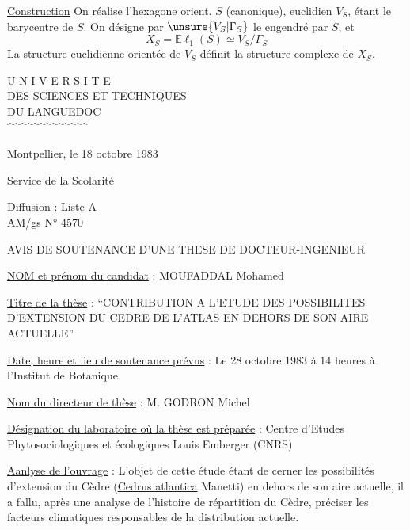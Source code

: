 \uline{Construction} On réalise l'hexagone orient. $S$  (canonique),   euclidien $V_S$,   étant le barycentre de $S$. On désigne par $\unsure{V_S|\Gamma_S}$ le   engendré par $S$, et
\[
X_S=\mathbb E\ell_1(S)\simeq V_S/\Gamma_S
\]
La structure euclidienne \uline{orientée} de $V_S$ définit la structure complexe de $X_S$.


\begin{center}
U N I V E R S I T E\\
DES SCIENCES ET TECHNIQUES\\
DU LANGUEDOC\\
\textasciicircum\textasciicircum\textasciicircum\textasciicircum\textasciicircum\textasciicircum\textasciicircum\textasciicircum\textasciicircum\textasciicircum\textasciicircum\textasciicircum\textasciicircum
\end{center}

Montpellier, le 18 octobre 1983

Service de la Scolarité

Diffusion : Liste A\\
AM/gs \hfill N° 4570

\begin{center}
AVIS DE SOUTENANCE D'UNE THESE DE DOCTEUR-INGENIEUR

\end{center}

\uline{NOM et prénom du candidat} : MOUFADDAL Mohamed

\uline{Titre de la thèse} : ``CONTRIBUTION A L'ETUDE DES POSSIBILITES D'EXTENSION DU CEDRE DE L'ATLAS EN DEHORS DE SON AIRE ACTUELLE''

\uline{Date, heure et lieu de soutenance prévus} : Le 28 octobre 1983 à 14 heures à l'Institut de Botanique

\uline{Nom du directeur de thèse} : M. GODRON Michel

\uline{Désignation du laboratoire où la thèse est préparée} : Centre d'Etudes Phytosociologiques et écologiques Louis Emberger (CNRS)

\uline{Aanlyse de l'ouvrage} : L'objet de cette étude étant de cerner les possibilités d'extension du Cèdre (\uline{Cedrus atlantica} Manetti) en dehors de son aire actuelle, il a fallu, après une analyse de l'histoire de répartition du Cèdre, préciser les facteurs climatiques responsables de la distribution actuelle.

